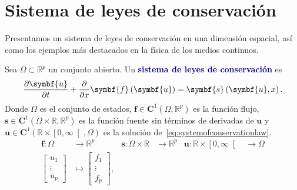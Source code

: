 \chapter{Sistema de leyes de conservación}

Presentamos un sistema de leyes de conservación en una dimensión
espacial, así como los ejemplos más destacados en la física de los
medios continuos.

\begin{definition}
	Sea $\Omega\subset\mathbb{R}^{p}$ un conjunto abierto.
	Un \textcolor{DarkBlue}{\bfseries sistema de leyes de conservación}
	es
	\begin{equation}\label{eq:systemofconservationlaw}
		\diffp{\symbf{u}}{t}+
		\diffp{}{x}
		\symbf{f}\left(\symbf{u}\right)=
		\symbf{s}\left(\symbf{u},x\right).
	\end{equation}
	Donde $\Omega$ es el conjunto de estados,
	\begin{math}
		\symbf{f}\in\symbf{C}^{1}
		\left(\Omega,\mathbb{R}^{p}\right)
	\end{math}
	es la función flujo,
	\begin{math}
		\symbf{s}\in
		\symbf{C}^{1}
		\left(\Omega\times\mathbb{R},\mathbb{R}^{p}\right)
	\end{math}
	es la función fuente sin términos de derivadas de $\symbf{u}$ y
	\begin{math}
		\symbf{u}\in
		\symbf{C}^{1}
		\left(\mathbb{R}\times\left[0,\infty\right[,\Omega\right)
	\end{math} es la solución de~\eqref{eq:systemofconservationlaw}.
	\begin{align*}
		\symbf{f}\colon\Omega                                &
		\longrightarrow\mathbb{R}^{p}                        &
		\symbf{s}\colon\Omega\times\mathbb{R}                &
		\longrightarrow\mathbb{R}^{p}                        &
		\symbf{u}\colon\mathbb{R}\times\left[0,\infty\right[ &
		\longrightarrow\Omega                                  \\
		\begin{bmatrix}
			u_{1}  \\
			\vdots \\
			u_{p}
		\end{bmatrix}                                      &
		\longmapsto
		\begin{bmatrix}
			f_{1}  \\
			\vdots \\
			f_{p}
		\end{bmatrix},                                      &

\end{align*}
\end{definition}
